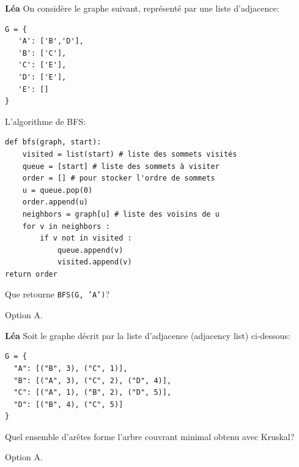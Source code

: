 \begin{Exercice}[5 minutes]\textbf{Léa}
On considère le graphe suivant, représenté par une liste d’adjacence:

\begin{lstlisting}
G = {
   'A': ['B','D'],
   'B': ['C'],
   'C': ['E'],
   'D': ['E'],
   'E': []
}
\end{lstlisting}

L'algorithme de BFS: 

\begin{lstlisting}[style=pythonstyle]
def bfs(graph, start):
    visited = list(start) # liste des sommets visités
    queue = [start] # liste des sommets à visiter
    order = [] # pour stocker l'ordre de sommets
    u = queue.pop(0) 
    order.append(u)
    neighbors = graph[u] # liste des voisins de u
    for v in neighbors : 
        if v not in visited : 
            queue.append(v)
            visited.append(v)
return order 
\end{lstlisting}

Que retourne \texttt{BFS(G, 'A')}?

\mcqlist{
{$[$'A','B','D','C','E'$]$ }, {$[$'A','D','B','C','E'$]$}, {$[$'A','B','C','D','E'$]$}, {$[$'A','D','E','B','C'$]$}
}

\begin{solution}
Option A. 
\end{solution}

\end{Exercice}

\begin{Exercice}[5 minutes]\textbf{Léa}
Soit le graphe décrit par la liste d'adjacence (adjacency list) ci-dessous:

\begin{lstlisting}
G = {
  "A": [("B", 3), ("C", 1)],
  "B": [("A", 3), ("C", 2), ("D", 4)],
  "C": [("A", 1), ("B", 2), ("D", 5)],
  "D": [("B", 4), ("C", 5)]
}
\end{lstlisting}

Quel ensemble d’arêtes forme l’arbre couvrant minimal obtenu avec Kruskal?


\begin{solution}
Option A. 
\end{solution}

\end{Exercice}



